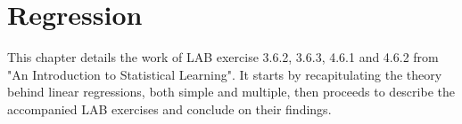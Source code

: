 \chapter{Regression} \label{ch:regression}

This chapter details the work of LAB exercise 3.6.2, 3.6.3, 4.6.1 and 4.6.2 from "An Introduction to Statistical Learning". It starts by recapitulating the theory behind linear regressions, both simple and multiple, then proceeds to describe the accompanied LAB exercises and conclude on their findings.





